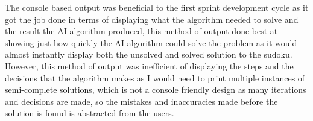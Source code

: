 \documentclass[]{final_report}
\begin{document}
The console based output was beneficial to the first sprint development cycle as it got the job done in terms of displaying what the algorithm needed to solve and the result the AI algorithm produced, this method of output done best at showing just how quickly the AI algorithm could solve the problem as it would almost instantly display both the unsolved and solved solution to the sudoku. However, this method of output was inefficient of displaying the steps and the decisions that the algorithm makes as I would need to print multiple instances of semi-complete solutions, which is not a console friendly design as many iterations and decisions are made, so the mistakes and inaccuracies made before the solution is found is abstracted from the users. 

\begin{figure}[ht]
    \centering 
    \begin{minipage}{0.3\textwidth} 

\end{minipage}
\end{figure}
\end{document}
